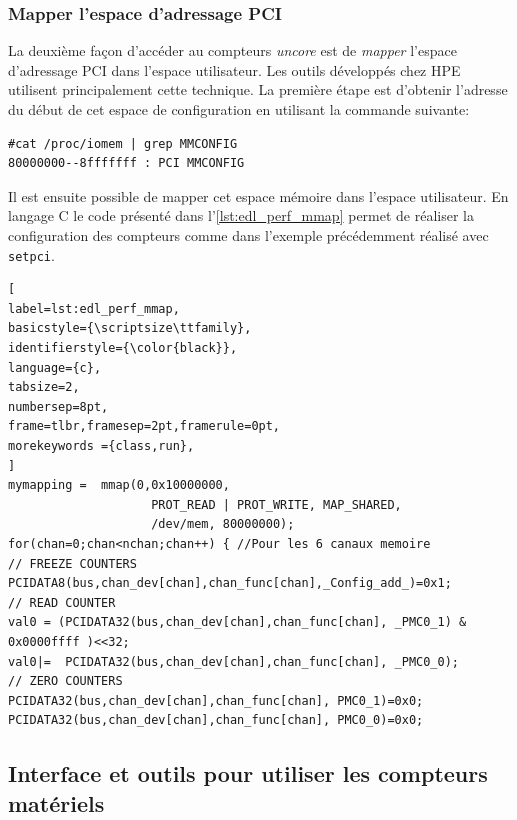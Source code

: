     \subsubsection{Mapper l'espace d'adressage PCI}
    La deuxième façon d'accéder au compteurs \textit{uncore} est de \textit{mapper} l'espace d'adressage PCI dans l'espace utilisateur. Les outils développés chez HPE utilisent principalement cette technique. La première étape est d'obtenir l'adresse du début de cet espace de configuration en utilisant la commande suivante:
\begin{verbatim}
#cat /proc/iomem | grep MMCONFIG  
80000000--8fffffff : PCI MMCONFIG
\end{verbatim}
    Il est ensuite possible de mapper cet espace mémoire dans l'espace utilisateur. En langage C le code présenté dans l'\autoref{lst:edl_perf_mmap} permet de réaliser la configuration des compteurs comme dans l'exemple précédemment réalisé avec \verb|setpci|.
    \begin{lstlisting}[
label=lst:edl_perf_mmap,
basicstyle={\scriptsize\ttfamily},
identifierstyle={\color{black}},
language={c},
tabsize=2,
numbersep=8pt,
frame=tlbr,framesep=2pt,framerule=0pt,
morekeywords ={class,run},
]
mymapping =  mmap(0,0x10000000, 
		            PROT_READ | PROT_WRITE, MAP_SHARED, 		 
		            /dev/mem, 80000000);
for(chan=0;chan<nchan;chan++) { //Pour les 6 canaux memoire 
// FREEZE COUNTERS 
PCIDATA8(bus,chan_dev[chan],chan_func[chan],_Config_add_)=0x1; 
// READ COUNTER 
val0 = (PCIDATA32(bus,chan_dev[chan],chan_func[chan], _PMC0_1) & 0x0000ffff )<<32; 
val0|=  PCIDATA32(bus,chan_dev[chan],chan_func[chan], _PMC0_0); 
// ZERO COUNTERS 
PCIDATA32(bus,chan_dev[chan],chan_func[chan], PMC0_1)=0x0;
PCIDATA32(bus,chan_dev[chan],chan_func[chan], PMC0_0)=0x0;
\end{lstlisting}
    
    
    
    
    \subsection{Interface et outils pour utiliser les compteurs matériels}
    
